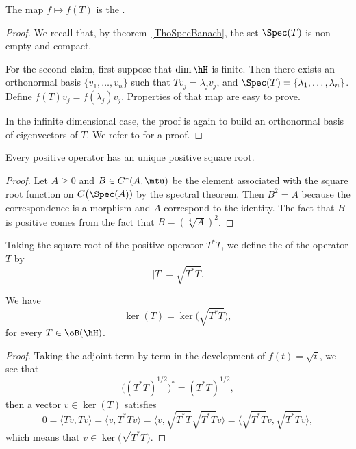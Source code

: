 The map $f\mapsto f(T)$ is the .

\begin{proof}

	We recall that, by theorem~\ref{ThoSpecBanach}, the set $\Spec(T)$ is non empty and compact.

	For the second claim, first suppose that $\dim\hH$ is finite. Then there exists an orthonormal basis $\{ v_1,\ldots,v_n \}$ such that $Tv_j=\lambda_jv_j$, and $\Spec(T)=\{ \lambda_1,\ldots,\lambda_n \}$. Define $f(T)v_j=f(\lambda_j)v_j$. Properties of that map are easy to prove.

	In the infinite dimensional case, the proof is again to build an orthonormal basis of eigenvectors of $T$. We refer to \cite{Wassermann,Landsman} for a proof.
\end{proof}

\begin{corollary}
Every positive operator has an unique positive square root.
\end{corollary}

\begin{proof}
	Let $A\geq 0$ and $B\in C^*(A,\mtu)$ be the element associated with the square root function on $C\big(\Spec(A))$ by the spectral theorem. Then $B^2=A$ because the correspondence is a morphism and $A$ correspond to the identity. The fact that $B$ is positive comes from the fact that $B=\left( \sqrt[4]{A} \right)^2$.
\end{proof}

Taking the square root of the positive operator $T^*T$, we define the  of the operator $T$ by
\begin{equation}		\label{EqAbsValT}
	| T |=\sqrt{T^*T}.
\end{equation}

\begin{lemma}		\label{LemkerTkersqrtT}
We have
\[
 \ker(T)=\ker\big( \sqrt{T^*T} \big),
\]
for every $T\in\oB(\hH)$.
\end{lemma}

\begin{proof}
	Taking the adjoint term by term in the development of $f(t)=\sqrt{t}$, we see that
	\[
	  \Big( (T^*T)^{1/2} \Big)^*=(T^*T)^{1/2},
	\]
	then a vector $v\in\ker(T)$ satisfies
	\[
	  0=\langle Tv, Tv\rangle =\langle v, T^*Tv\rangle =\langle v,\sqrt{T^*T}\sqrt{T^*T}v \rangle =\langle \sqrt{T^*T}v, \sqrt{T^*T}v\rangle,
	\]
	which means that $v\in\ker\big( \sqrt{T^*T} \big)$.
\end{proof}



